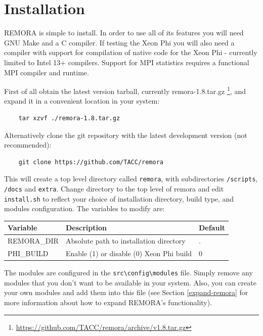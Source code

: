 \documentclass[10pt,a4paper]{report}
\begin{document}
\chapter{Installation}
REMORA is simple to install. In order to use all of its features you will need GNU Make and a C compiler. If testing the Xeon Phi you will also need a compiler with support for compilation of native code for the Xeon Phi - currently limited to Intel 13+ compilers. Support for MPI statistics requires a functional MPI compiler and runtime.

First of all obtain the latest version tarball, currently remora-1.8.tar.gz \footnote{\href{https://github.com/TACC/remora/archive/v1.8.tar.gz}{https://github.com/TACC/remora/archive/v1.8.tar.gz}}, and expand it in a convenient location in your system:

\begin{verbatim}
    tar xzvf ./remora-1.8.tar.gz
\end{verbatim}

Alternatively clone the git repository with the latest development version (not recommended):

\begin{verbatim}
    git clone https://github.com/TACC/remora
\end{verbatim}

This will create a top level directory called \verb+remora+, with subdirectories \verb+/scripts+, \verb+/docs+ and \verb+extra+. Change directory to the top level of remora and edit \verb+install.sh+ to reflect your choice of installation directory, build type, and modules configuration. The variables to modify are:

\begin{table}[h]
\centering
\label{tab:env}
\begin{tabular}{|l|l|l|}
\hline
\bf{Variable}	& \bf{Description}                          & \bf{Default}\\\hline
REMORA\_DIR     & Absolute path to installation directory   & . \\\hline
PHI\_BUILD      & Enable (1) or disable (0) Xeon Phi build  & 0 \\\hline
\end{tabular}
\end{table}

The modules are configured in the \verb+src\config\modules+ file. Simply remove any modules that you don't want to be available in your system. Also, you can create your own modules and add them into this file (see Section \ref{expand-remora} for more information about how to expand REMORA's functionality).
\end{document}
